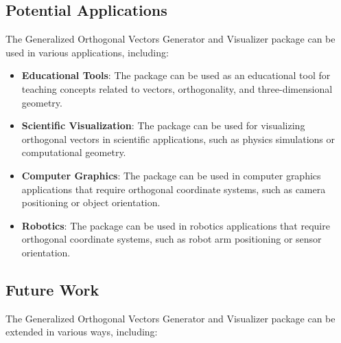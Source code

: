 \subsection{Potential Applications}

The Generalized Orthogonal Vectors Generator and Visualizer package can be used in various applications, including:

\begin{itemize}
    \item \textbf{Educational Tools}: The package can be used as an educational tool for teaching concepts related to vectors, orthogonality, and three-dimensional geometry.
    
    \item \textbf{Scientific Visualization}: The package can be used for visualizing orthogonal vectors in scientific applications, such as physics simulations or computational geometry.
    
    \item \textbf{Computer Graphics}: The package can be used in computer graphics applications that require orthogonal coordinate systems, such as camera positioning or object orientation.
    
    \item \textbf{Robotics}: The package can be used in robotics applications that require orthogonal coordinate systems, such as robot arm positioning or sensor orientation.
\end{itemize}

\subsection{Future Work}

The Generalized Orthogonal Vectors Generator and Visualizer package can be extended in various ways, including:

